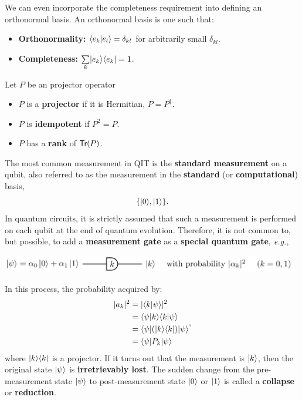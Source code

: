 \documentclass[12pt]{article}
\begin{document}
\begin{definition}
We can even incorporate the completeness requirement into defining an orthonormal basis. An orthonormal basis is one such that:
\begin{itemize}
    \item \textbf{Orthonormality:} $\bk{e_k}{e_l} = \delta_{kl}$ for arbitrarily small $\delta_{kl}$.
    \item \textbf{Completeness:} $\underset{k}{\sum} \kb{e_k}{e_k} = 1$.
\end{itemize}
\end{definition}

\begin{definition}
Let $P$ be an projector operator
\begin{itemize}
    \item $P$ is a \textbf{projector} if it is Hermitian, $P = P^\dag$.
    \item $P$ is \textbf{idempotent} if $P^2 = P$.
    \item $P$ has a \textbf{rank} of $\Trace{P}$.
\end{itemize}
\end{definition}

\begin{remark}
The most common measurement in QIT is the \textbf{standard measurement} on a qubit, also referred to as the measurement in the \textbf{standard} (or \textbf{computational}) basis, $$
\{\Ket{0}, \Ket{1}\}.
$$ In quantum circuits, it is strictly assumed that such a measurement is performed on each qubit at the end of quantum evolution. Therefore, it is not common to, but possible, to add a \textbf{measurement gate} as a \textbf{special quantum gate}, $\eg$
\begin{center}
\includegraphics[width = 35em]{images/1.jpg}
\end{center}

In this process, the probability acquired by:$$
\begin{aligned}
|a_k|^2
    &= |\bk{k}{\psi}|^2\\
    &= \bk{\psi}{k}\bk{k}{\psi}\\
    &= \Bra{\psi}(\kb{k}{k})\Ket{\psi}\\
    &= \Bra{\psi} P_k\Ket{\psi}
\end{aligned},
$$ where $\kb{k}{k}$ is a projector. If it turns out that the measurement is $\Ket{k}$, then the original state $\Ket{\psi}$ is \textbf{irretrievably lost}. The sudden change from the pre-measurement state $\Ket{\psi}$ to post-measurement state $\Ket{0}$ or $\Ket{1}$ is called a \textbf{collapse} or \textbf{reduction}.
\end{remark}
\end{document}
